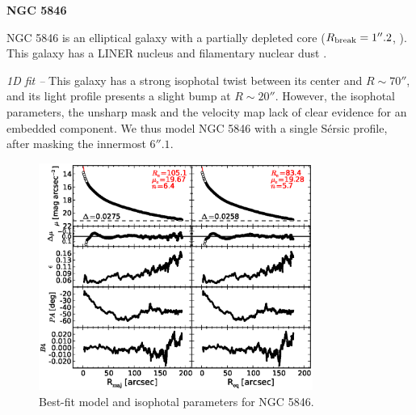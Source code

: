 \documentclass[preprint2]{emulateapj}
\newcommand{\fitfigurewidth}{0.8\textwidth}
\begin{document}
  \clearpage\newpage\noindent
  {\bf NGC 5846 \\}

  NGC 5846 is an elliptical galaxy with a partially depleted core ($R_{\rm break} = 1''.2$, \citealt{rusli2013}).
  This galaxy has a LINER nucleus \citep{carrillo1999} and filamentary nuclear dust \citep{tran2001}.


  \emph{1D fit -- }
  This galaxy has a strong isophotal twist between its center and $R \sim 70''$, and
  its light profile presents a slight bump at $R \sim 20''$.
  However, the isophotal parameters, the unsharp mask and the velocity map lack of clear evidence for an embedded component.
  We thus model NGC 5846 with a single S\'ersic profile, after masking the innermost $6''.1$.

  \begin{figure}[h]
  \begin{center}
  \includegraphics[width=\fitfigurewidth]{images/n5846_1Dfit.eps}
  \caption{Best-fit model and isophotal parameters for NGC 5846.}
  \end{center}
  \end{figure}
\end{document}
